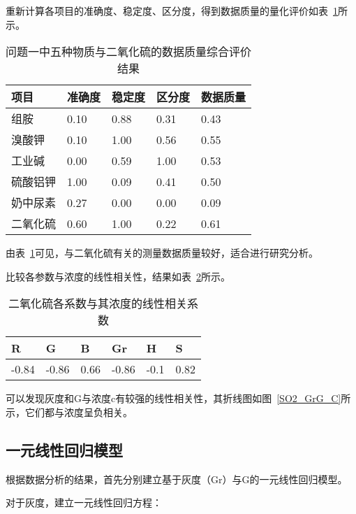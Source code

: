 重新计算各项目的准确度、稳定度、区分度，得到数据质量的量化评价如表~\ref{SO2_Judge}所示。

\begin{table}[]
    \centering
    \caption{问题一中五种物质与二氧化硫的数据质量综合评价结果}
    \label{SO2_Judge}
    \begin{tabular}{@{}lllll@{}}
    \toprule
    项目   & 准确度  & 稳定度  & 区分度  & 数据质量 \\ \midrule
    组胺   & 0.10 & 0.88 & 0.31 & 0.43 \\
    溴酸钾  & 0.10 & 1.00 & 0.56 & 0.55 \\
    工业碱  & 0.00 & 0.59 & 1.00 & 0.53 \\
    硫酸铝钾 & 1.00 & 0.09 & 0.41 & 0.50 \\
    奶中尿素 & 0.27 & 0.00 & 0.00 & 0.09 \\
    二氧化硫 & 0.60 & 1.00 & 0.22 & 0.61 \\ \bottomrule
    \end{tabular}
    \end{table}

由表~\ref{SO2_Judge}可见，与二氧化硫有关的测量数据质量较好，适合进行研究分析。

比较各参数与浓度的线性相关性，结果如表~\ref{SO2_corr}所示。

\begin{table}[]
    \centering
    \caption{二氧化硫各系数与其浓度的线性相关系数}
    \label{SO2_corr}
    \begin{tabular}{@{}llllll@{}}
    \toprule
    R     & G     & B    & Gr    & H    & S    \\ \midrule
    -0.84 & -0.86 & 0.66 & -0.86 & -0.1 & 0.82 \\ \bottomrule
    \end{tabular}
    \end{table}


可以发现灰度和G与浓度c有较强的线性相关性，其折线图如图~\ref{SO2_GrG_C}所示，它们都与浓度呈负相关。


\subsection{一元线性回归模型}

根据数据分析的结果，首先分别建立基于灰度（Gr）与G的一元线性回归模型。

对于灰度，建立一元线性回归方程：

